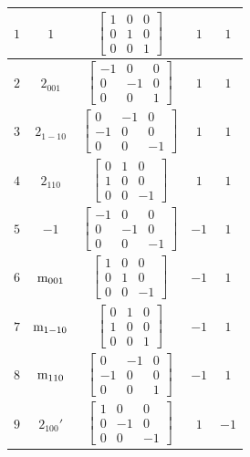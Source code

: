 \documentclass[fleqn,8pt]{jsarticle}
\begin{document}
\begin{longtable}{ccccc}
$ 1 $ & $ 1 $ & $ \begin{bmatrix} 1 & 0 & 0 \\ 0 & 1 & 0 \\ 0 & 0 & 1 \end{bmatrix} $ & $ 1 $ & $ 1 $ \\ \hline
$ 2 $ & $ 2{}_{001} $ & $ \begin{bmatrix} -1 & 0 & 0 \\ 0 & -1 & 0 \\ 0 & 0 & 1 \end{bmatrix} $ & $ 1 $ & $ 1 $ \\ \hline
$ 3 $ & $ 2{}_{1-10} $ & $ \begin{bmatrix} 0 & -1 & 0 \\ -1 & 0 & 0 \\ 0 & 0 & -1 \end{bmatrix} $ & $ 1 $ & $ 1 $ \\ \hline
$ 4 $ & $ 2{}_{110} $ & $ \begin{bmatrix} 0 & 1 & 0 \\ 1 & 0 & 0 \\ 0 & 0 & -1 \end{bmatrix} $ & $ 1 $ & $ 1 $ \\ \hline
$ 5 $ & $ -1 $ & $ \begin{bmatrix} -1 & 0 & 0 \\ 0 & -1 & 0 \\ 0 & 0 & -1 \end{bmatrix} $ & $ -1 $ & $ 1 $ \\ \hline
$ 6 $ & $ {\rm m}_{001} $ & $ \begin{bmatrix} 1 & 0 & 0 \\ 0 & 1 & 0 \\ 0 & 0 & -1 \end{bmatrix} $ & $ -1 $ & $ 1 $ \\ \hline
$ 7 $ & $ {\rm m}_{1-10} $ & $ \begin{bmatrix} 0 & 1 & 0 \\ 1 & 0 & 0 \\ 0 & 0 & 1 \end{bmatrix} $ & $ -1 $ & $ 1 $ \\ \hline
$ 8 $ & $ {\rm m}_{110} $ & $ \begin{bmatrix} 0 & -1 & 0 \\ -1 & 0 & 0 \\ 0 & 0 & 1 \end{bmatrix} $ & $ -1 $ & $ 1 $ \\ \hline
$ 9 $ & $ 2{}_{100}{}' $ & $ \begin{bmatrix} 1 & 0 & 0 \\ 0 & -1 & 0 \\ 0 & 0 & -1 \end{bmatrix} $ & $ 1 $ & $ -1 $ \\ \hline

\end{longtable}
\end{document}
